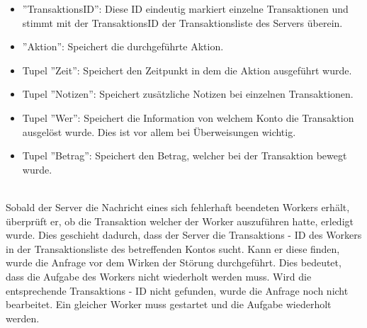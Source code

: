 \begin{itemize}
	\item ''TransaktionsID'': Diese ID eindeutig markiert einzelne Transaktionen und stimmt mit der TransaktionsID der Transaktionsliste des Servers überein.
	\item ''Aktion'': Speichert die durchgeführte Aktion.
	\item Tupel ''Zeit'': Speichert den Zeitpunkt in dem die Aktion ausgeführt wurde.
	\item Tupel ''Notizen'': Speichert zusätzliche Notizen bei einzelnen Transaktionen.
	\item Tupel ''Wer'': Speichert die Information von welchem Konto die Transaktion ausgelöst wurde. Dies ist vor allem bei Überweisungen wichtig.
	\item Tupel ''Betrag'': Speichert den Betrag, welcher bei der Transaktion bewegt wurde.
\end{itemize}
\\
Sobald der Server die Nachricht eines sich fehlerhaft beendeten Workers erhält, überprüft er, ob die Transaktion welcher der Worker auszuführen hatte, erledigt wurde. Dies geschieht dadurch, dass der Server die Transaktions - ID des Workers in der Transaktionsliste des betreffenden Kontos sucht. Kann er diese finden, wurde die Anfrage vor dem Wirken der Störung durchgeführt. Dies bedeutet, dass die Aufgabe des Workers nicht wiederholt werden muss. Wird die entsprechende Transaktions - ID nicht gefunden, wurde die Anfrage noch nicht bearbeitet. Ein gleicher Worker muss gestartet und die Aufgabe wiederholt werden.

%
%
%